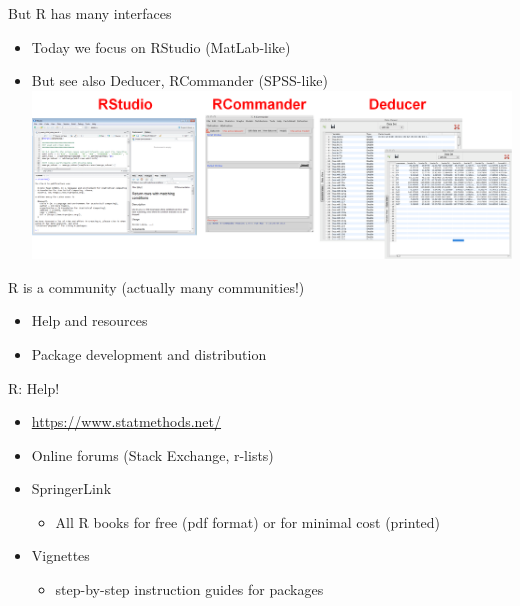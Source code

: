 \documentclass[
  ignorenonframetext,
]{beamer}
\providecommand{\tightlist}{%
  \setlength{\itemsep}{0pt}\setlength{\parskip}{0pt}}
\begin{document}
\begin{frame}{But R has many interfaces}
\protect\hypertarget{but-r-has-many-interfaces}{}

\begin{itemize}[<+->]
\tightlist
\item
  Today we focus on RStudio (MatLab-like)
\item
  But see also Deducer, RCommander (SPSS-like)
  \includegraphics{../external/images/intro_rgui_2.PNG}
\end{itemize}

\end{frame}

\begin{frame}{R is a community (actually many communities!)}
\protect\hypertarget{r-is-a-community-actually-many-communities}{}

\begin{itemize}[<+->]
\tightlist
\item
  Help and resources
\item
  Package development and distribution
\end{itemize}

\end{frame}

\begin{frame}{R: Help!}
\protect\hypertarget{r-help}{}

\begin{itemize}[<+->]
\tightlist
\item
  \url{https://www.statmethods.net/}
\item
  Online forums (Stack Exchange, r-lists)
\item
  SpringerLink

  \begin{itemize}[<+->]
  \tightlist
  \item
    All R books for free (pdf format) or for minimal cost (printed)
  \end{itemize}
\item
  Vignettes

  \begin{itemize}[<+->]
  \tightlist
  \item
    step-by-step instruction guides for packages
  \end{itemize}
\end{itemize}

\end{frame}
\end{document}
